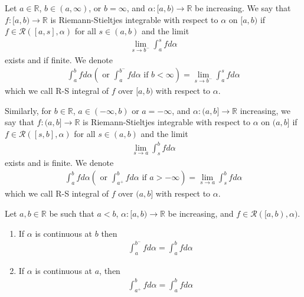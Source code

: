 \documentclass{tufte-handout}
\begin{document}
\begin{Definition}
    Let \( a \in \mathbb{R} \), \( b \in (a, \infty) \), 
    or \( b=\infty \), and \( \alpha: [a,b)\to \mathbb{R} \)
    be increasing. We say that \( f: [a,b) \to \mathbb{R} \) is
    Riemann-Stieltjes integrable with respect to \( \alpha \) on \([a,b)\) if
    \(f\in \mathcal{R}([a,s], \alpha) \) for all \( s \in (a,b) \) and the limit 
    \begin{align}
    \lim_{s\to b^-} \int_{a}^s fd\alpha
    \end{align}
    exists and if finite.
    We denote 
    \begin{align}
    \int_{a}^{b}fd\alpha \left(\text{ or } \int_{a}^{b^-}fd\alpha  \text{ if } b < \infty  \right)
    = \lim_{s\to b^-} \int_{a}^s fd\alpha
    \end{align}
    which we call R-S integral of \( f \) over \([a,b)\) with respect to \( \alpha \).

    Similarly, for \( b \in \mathbb{R} \), \( a \in (-\infty, b) \) or \( a = -\infty \), and \( \alpha: (a,b] \to \mathbb{R} \) increasing,
    we say that \( f: (a,b] \to \mathbb{R} \) is Riemann-Stieltjes integrable with respect to \( \alpha \) on \( (a,b] \) if \( f \in \mathcal{R}([s,b], \alpha) \) for all 
    \( s \in (a,b) \) and the limit
    \begin{align}
    \lim_{s\to a} \int_{s}^b fd\alpha
    \end{align}
    exists and is finite. We denote
    \begin{align}
    \int_{a}^{b}fd\alpha \left(\text{ or } \int_{a^+}^{b}fd\alpha  \text{ if } a > -\infty  \right)
    = \lim_{s\to a} \int_{s}^b fd\alpha
    \end{align}
    which we call R-S integral of \( f \) over \( (a,b] \) with respect to \( \alpha \).
\end{Definition}


\begin{Proposition}
    Let \( a, b \in \mathbb{R} \) be such that \( a<b \),
    \( \alpha: [a,b) \to \mathbb{R} \) be increasing,
    and \( f\in \mathcal{R}([a,b), \alpha) \).
    \begin{enumerate}
        \item If \( \alpha \) is continuous at \( b \) then 
        \begin{align}
            \int_{a}^{b^-}fd\alpha = \int_{a}^b fd\alpha
        \end{align}
        \item If \( \alpha \) is continuous at \( a\), then 
        \begin{align}
            \int_{a^+}^{b}fd\alpha = \int_{a}^b fd\alpha
        \end{align}
    \end{enumerate}
\end{Proposition}
\end{document}
